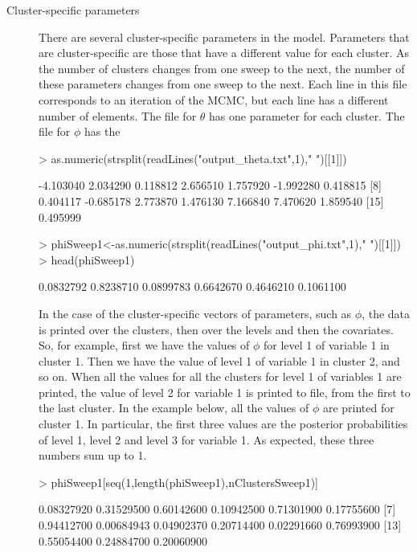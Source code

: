 \documentclass{article}
\begin{document}
\begin{description}
\item[Cluster-specific parameters] There are several cluster-specific parameters in the model. Parameters that are cluster-specific are those that have a different value for each cluster. As the number of clusters changes from one sweep to the next, the number of these parameters changes from one sweep to the next. Each line in this file corresponds to an iteration of the MCMC, but each line has a different number of elements. The file for $\theta$ has one parameter for each cluster. The file for $\phi$ has the 
\begin{Schunk}
\begin{Sinput}
> as.numeric(strsplit(readLines("output_theta.txt",1)," ")[[1]])
\end{Sinput}
\begin{Soutput}
 [1] -4.103040  2.034290  0.118812  2.656510  1.757920 -1.992280  0.418815
 [8]  0.404117 -0.685178  2.773870  1.476130  7.166840  7.470620  1.859540
[15]  0.495999
\end{Soutput}
\begin{Sinput}
> phiSweep1<-as.numeric(strsplit(readLines("output_phi.txt",1)," ")[[1]])
> head(phiSweep1)
\end{Sinput}
\begin{Soutput}
[1] 0.0832792 0.8238710 0.0899783 0.6642670 0.4646210 0.1061100
\end{Soutput}
\end{Schunk}

In the case of the cluster-specific vectors of parameters, such as $\phi$, the data is printed over the clusters, then over the levels and then the covariates. So, for example, first we have the values of $\phi$ for level 1 of variable 1 in cluster 1. Then we have the value of level 1 of variable 1 in cluster 2, and so on. When all the values for all the clusters for level 1 of variables 1 are printed, the value of level 2 for variable 1 is printed to file, from the first to the last cluster. In the example below, all the values of $\phi$ are printed for cluster 1. In particular, the first three values are the posterior probabilities of level 1, level 2 and level 3 for variable 1. As expected, these three numbers sum up to 1. 

\begin{Schunk}
\begin{Sinput}
> phiSweep1[seq(1,length(phiSweep1),nClustersSweep1)]
\end{Sinput}
\begin{Soutput}
 [1] 0.08327920 0.31529500 0.60142600 0.10942500 0.71301900 0.17755600
 [7] 0.94412700 0.00684943 0.04902370 0.20714400 0.02291660 0.76993900
[13] 0.55054400 0.24884700 0.20060900
\end{Soutput}
\end{Schunk}


\end{description}
\end{document}
